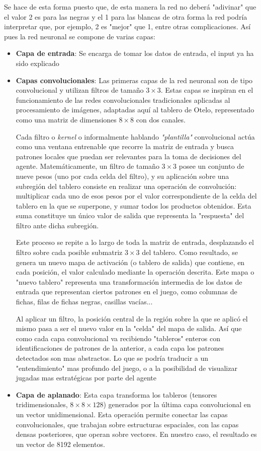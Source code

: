 \documentclass[conference]{IEEEtran}
\begin{document}
Se hace de esta forma puesto que, de esta manera la red no deberá "adivinar" que el valor 2 es para las negras y el 1 para las blancas
de otra forma la red podría interpretar que, por ejemplo, 2 es "mejor" que 1, entre otras complicaciones.
Así pues la red neuronal se compone de varias capas:
\begin{itemize}
    \item \textbf{Capa de entrada}: Se encarga de tomar los datos de entrada, el input ya ha sido explicado 
    \item \textbf{Capas convolucionales}: Las primeras capas de la red neuronal son de tipo convolucional y utilizan filtros de tamaño $3 \times 3$. Estas capas se inspiran en el funcionamiento de las redes convolucionales tradicionales aplicadas al procesamiento de imágenes, adaptadas aquí al tablero de Otelo, representado como una matriz de dimensiones $8 \times 8$ con dos canales.

Cada filtro o \textit{kernel} o informalmente hablando \textit{"plantilla"} convolucional actúa como una ventana entrenable que recorre la matriz de entrada y busca patrones locales que puedan ser relevantes para la toma de decisiones del agente. Matemáticamente, un filtro de tamaño $3 \times 3$ posee un conjunto de nueve pesos (uno por cada celda del filtro), y su aplicación sobre una subregión del tablero consiste en realizar una operación de convolución: multiplicar cada uno de esos pesos por el valor correspondiente de la celda del tablero en la que se superpone, y sumar todos los productos obtenidos. Esta suma constituye un único valor de salida que representa la "respuesta" del filtro ante dicha subregión.

Este proceso se repite a lo largo de toda la matriz de entrada, desplazando el filtro sobre cada posible submatriz $3 \times 3$ del tablero. Como resultado, se genera un nuevo mapa de activación (o tablero de salida) que contiene, en cada posición, el valor calculado mediante la operación descrita. Este mapa o "nuevo tablero" representa una transformación intermedia de los datos de entrada que representan ciertos patrones en el juego, como columnas de fichas, filas de fichas negras, casillas vacías...

 Al aplicar un filtro, la posición central de la región sobre la que se aplicó el mismo pasa a ser el nuevo valor en la "celda" del mapa de salida. Así que como cada capa convolucional va recibiendo "tableros" enteros con identificaciones de patrones de la anterior, a cada capa los patrones detectados son mas abstractos. Lo que se podría traducir a un "entendimiento" mas profundo del juego, o a la posibilidad de visualizar jugadas mas estratégicas por parte del agente
\item \textbf{Capa de aplanado}: Esta capa transforma los tableros (tensores tridimensionales, $8 \times 8 \times 128$) generados por la última capa convolucional en un vector unidimensional. Esta operación permite conectar las capas convolucionales, que trabajan sobre estructuras espaciales, con las capas densas posteriores, que operan sobre vectores. En nuestro caso, el resultado es un vector de 8192 elementos.


\end{itemize}
\end{document}
